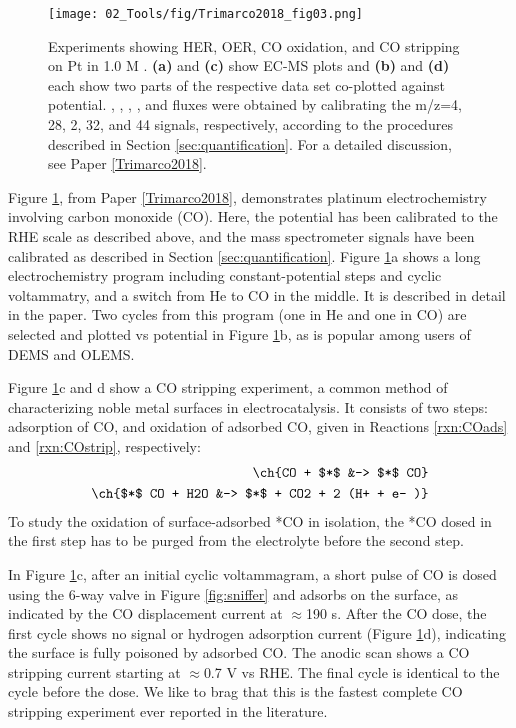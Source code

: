 \vspace{5mm}

\begin{figure}[b!]
	\centering
	\texttt{[image: 02\_Tools/fig/Trimarco2018\_fig03.png]}
	\caption{Experiments showing HER, OER, CO oxidation, and CO stripping on Pt in 1.0 M .  \textbf{(a)} and \textbf{(c)} show EC-MS plots and \textbf{(b)} and \textbf{(d)} each show two parts of the respective data set co-plotted against potential. , , , , and  fluxes were obtained by calibrating the m/z=4, 28, 2, 32, and 44 signals, respectively, according to the procedures described in Section \ref{sec:quantification}. For a detailed discussion, see Paper \ref{Trimarco2018}.}
	\label{fig:fig3}
\end{figure}

Figure \ref{fig:fig3}, from Paper \ref{Trimarco2018}, demonstrates platinum electrochemistry involving carbon monoxide (CO). Here, the potential has been calibrated to the RHE scale as described above, and the mass spectrometer signals have been calibrated as described in Section \ref{sec:quantification}. Figure \ref{fig:fig3}a shows a long electrochemistry program including constant-potential steps and cyclic voltammatry, and a switch from He to CO in the middle. It is described in detail in the paper. Two cycles from this program (one in He and one in CO) are selected and plotted vs potential in Figure \ref{fig:fig3}b, as is popular among users of DEMS and OLEMS.

Figure \ref{fig:fig3}c and d show a CO stripping experiment, a common method of characterizing noble metal surfaces in electrocatalysis\cite{Mayrhofer2005, Koper2009, Ganassin2017, Jensen2017_PhD}. It consists of two steps: adsorption of CO, and oxidation of adsorbed CO, given in Reactions \ref{rxn:COads} and \ref{rxn:COstrip}, respectively:
\begin{align}
\ch{CO + $*$ &-> $*$ CO}\label{rxn:COads}\\
\ch{$*$ CO + H2O &-> $*$ + CO2 + 2 (H+ + e- )}\label{rxn:COstrip}
\end{align}
To study the oxidation of surface-adsorbed *CO in isolation, the *CO dosed in the first step has to be purged from the electrolyte before the second step.

In Figure \ref{fig:fig3}c, after an initial cyclic voltammagram, a short pulse of CO is dosed using the 6-way valve in Figure \ref{fig:sniffer} and adsorbs on the surface, as indicated by the CO displacement current at $\approx$190 s. After the CO dose, the first cycle shows no  signal or hydrogen adsorption current (Figure \ref{fig:fig3}d), indicating the surface is fully poisoned by adsorbed CO. The anodic scan shows a CO stripping current starting at $\approx$0.7 V vs RHE. The final cycle is identical to the cycle before the  dose. We like to brag that this is the fastest complete CO stripping experiment ever reported in the literature.

